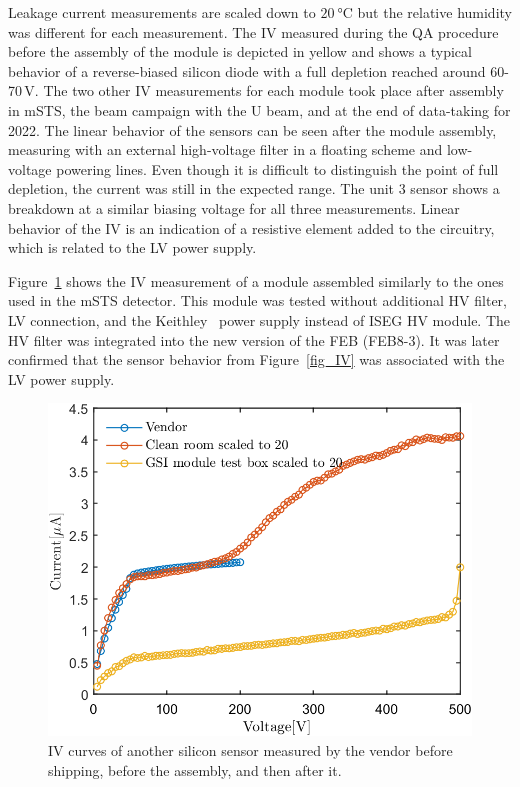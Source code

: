 Leakage current measurements are scaled down to $\SI{20}{\celsius}$ but the relative humidity was different for each measurement. The IV measured during the QA procedure before the assembly of the module is depicted in yellow and shows a typical behavior of a reverse-biased silicon diode with a full depletion reached around 60-70\,V. The two other IV measurements for each module took place after assembly in \gls{mSTS}, the beam campaign with the U beam, and at the end of data-taking for 2022. The linear behavior of the sensors can be seen after the module assembly, measuring with an external high-voltage filter in a floating scheme and low-voltage powering lines. Even though it is difficult to distinguish the point of full depletion, the current was still in the expected range. The unit 3 sensor shows a breakdown at a similar biasing voltage for all three measurements. Linear behavior of the IV is an indication of a resistive element added to the circuitry, which is related to the \gls{LV} power supply. 

Figure~\ref{fig_IV_good} shows the IV measurement of a module assembled similarly to the ones used in the \gls{mSTS} detector.
This module was tested without additional \gls{HV} filter, \gls{LV} connection, and the Keithley~\cite{Keithley} power supply instead of ISEG \gls{HV} module. The \gls{HV} filter was integrated into the new version of the \gls{FEB} (FEB8-3). It was later confirmed that the sensor behavior from Figure~\ref{fig_IV} was associated with the LV power supply. 

\begin{figure}[!h]
\centering
\includegraphics[width=0.5\columnwidth]{Chapter6/DCS/images/IV/30304Whole.png}
\caption{IV curves of another silicon sensor measured by the vendor before shipping, before the assembly, and then after it.} 
\label{fig_IV_good}
\end{figure}

\newpage
